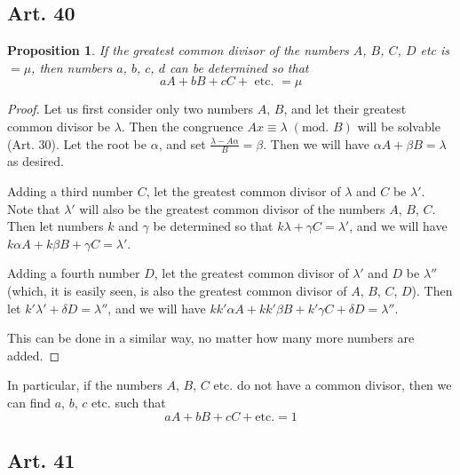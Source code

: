 \documentclass{book}
\theoremstyle{plain}
\newtheorem{proposition}{Proposition}
\theoremstyle{remark}
\begin{document}
\subsection*{Art. 40} 
\begin{proposition} If the greatest common divisor of the numbers $A$, $B$, $C$, $D$ etc is $=\mu$, then numbers $a$, $b$, $c$, $d$ can be determined so that 
\[ aA + bB + cC + \textrm{ etc. } = \mu \]
\end{proposition}
\begin{proof}  Let us first consider only two numbers $A$, $B$, and let their greatest common divisor be $\lambda$.  Then the congruence $Ax \equiv \lambda \;(\textrm{mod. }B)$ will be solvable (Art. 30).  Let the root be $\alpha$, and set $\frac{\lambda-A\alpha}{B} = \beta$. Then we will have $\alpha A + \beta B = \lambda$ as desired.

Adding a third number $C$, let the greatest common divisor of $\lambda$ and $C$ be $\lambda'$.  Note that $\lambda'$ will also be the greatest common divisor of the numbers $A$, $B$, $C$.   Then let numbers $k$ and $\gamma$ be determined so that $k \lambda + \gamma C = \lambda'$, and we will have $k\alpha A + k \beta B + \gamma C = \lambda'$. 

Adding a fourth number $D$, let the greatest common divisor of $\lambda'$ and $D$ be $\lambda''$ (which, it is easily seen, is also the greatest common divisor of $A$, $B$, $C$, $D$).  Then let $k' \lambda' + \delta D = \lambda''$, and we will have $kk'\alpha A + kk'\beta B + k'\gamma C + \delta D = \lambda''$. 

This can be done in a similar way, no matter how many more numbers are added. \end{proof}

In particular, if the numbers $A$, $B$, $C$ etc. do not have a common divisor, then we can find $a$, $b$, $c$ etc. such that 
\[ aA + bB + cC + \textrm{etc.} = 1 \]


\subsection*{Art. 41} 
\end{document}
